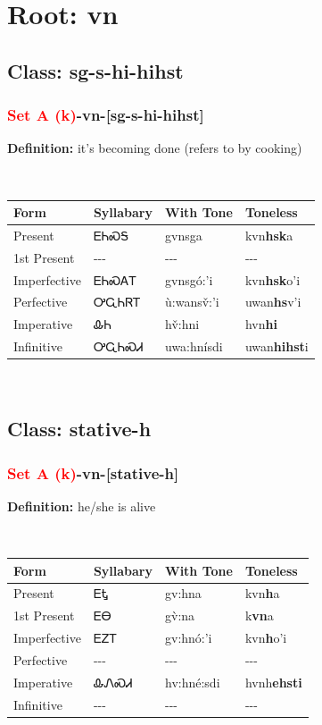 \needspace{4in}
\section*{Root: vn}
\nopagebreak
{}
\needspace{3in}
\subsection*{Class: sg-s-hi-hihst}
\nopagebreak
\needspace{2in}
\subsubsection*{\textcolor{Red}{Set A (k)}{-}\textbf{vn}{-}[sg-s-hi-hihst]}
\nopagebreak
\textbf{Definition: } it{\textquoteright}s becoming done (refers to by cooking)
\\[0.5em]
\begin{tabularx}{\textwidth}{l X X X}%
\toprule%
\textbf{Form}&\textbf{Syllabary}&\textbf{With Tone}&\textbf{Toneless}\\%
\midrule%
Present&ᎬᏂᏍᎦ&gvnsga&kvn\textbf{hsk}a\\%
1st Present&{-}{-}{-}&{-}{-}{-}&{-}{-}{-}\\%
Imperfective&ᎬᏂᏍᎪᎢ&gvnsgó:’i&kvn\textbf{hsk}o'i\\%
Perfective&ᎤᏩᏂᏒᎢ&ù:wansv̌:’i&uwan\textbf{hs}v'i\\%
Imperative&ᎲᏂ&hv̌:hni&hvn\textbf{hi}\\%
Infinitive&ᎤᏩᏂᏍᏗ&uwa:hnísdi&uwan\textbf{hihst}i\\%
\bottomrule%
\end{tabularx}
\\[1em]
\needspace{3in}
\subsection*{Class: stative-h}
\nopagebreak
\needspace{2in}
\subsubsection*{\textcolor{Red}{Set A (k)}{-}\textbf{vn}{-}[stative-h]}
\nopagebreak
\textbf{Definition: } he/she is alive
\\[0.5em]
\begin{tabularx}{\textwidth}{l X X X}%
\toprule%
\textbf{Form}&\textbf{Syllabary}&\textbf{With Tone}&\textbf{Toneless}\\%
\midrule%
Present&ᎬᎿ&gv:hna&kvn\textbf{h}a\\%
1st Present&ᎬᎾ&gv̀:na&k\textbf{vn}a\\%
Imperfective&ᎬᏃᎢ&gv:hnó:’i&kvn\textbf{h}o'i\\%
Perfective&{-}{-}{-}&{-}{-}{-}&{-}{-}{-}\\%
Imperative&ᎲᏁᏍᏗ&hv:hné:sdi&hvnh\textbf{ehsti}\\%
Infinitive&{-}{-}{-}&{-}{-}{-}&{-}{-}{-}\\%
\bottomrule%
\end{tabularx}
\\[1em]